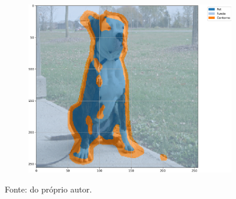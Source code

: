 \begin{figure}[H]
\begin{subfigure}[t]{0.32\textwidth}
         \label{results:fig:semantic:3.2}
     \end{subfigure}%
     ~ 
    \begin{subfigure}[t]{0.32\textwidth}
         \centering
         \includegraphics[width=1\linewidth]{recursos/imagens/results/bpca_miou_unet500_image_2_overlayed_segmentation.png}
         \label{results:fig:semantic:3.3}
     \end{subfigure}%

    Fonte: do próprio autor.
\end{figure}

